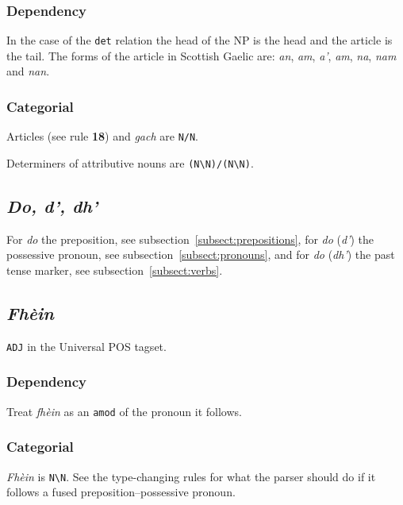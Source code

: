 \documentclass[a4paper]{article}
\begin{document}
\subsubsection*{Dependency}
 In the case of the \texttt{det} relation the head of the NP is the head and the article is the tail.
The forms of the article in Scottish Gaelic are: \textit{an}, \textit{am}, \textit{a'}, \textit{am}, \textit{na}, \textit{nam} and \textit{nan}.

\subsubsection*{Categorial}

 Articles (see rule {\bf 18}) and \textit{gach} are \texttt{N/N}.

 Determiners of attributive nouns are \texttt{(N\textbackslash N)/(N\textbackslash N)}.

\subsection{\textit{Do, d', dh'}\label{subsect:do}}

For \textit{do} the preposition, see subsection~\ref{subsect:prepositions},
for \textit{do} (\textit{d'}) the possessive pronoun, see subsection~\ref{subsect:pronouns}, and
for \textit{do} (\textit{dh'}) the past tense marker, see subsection~\ref{subsect:verbs}.

\subsection{\textit{Fh\`ein}\label{subsect:fhein}}

\texttt{ADJ} in the Universal POS tagset.

\subsubsection*{Dependency}
 Treat \textit{fh\`ein} as an \texttt{amod} of the pronoun it follows.

\subsubsection*{Categorial}
 \textit{Fh\`ein} is \texttt{N\textbackslash N}.
See the type-changing rules for what the parser should do if it follows a fused preposition--possessive pronoun.
\end{document}
